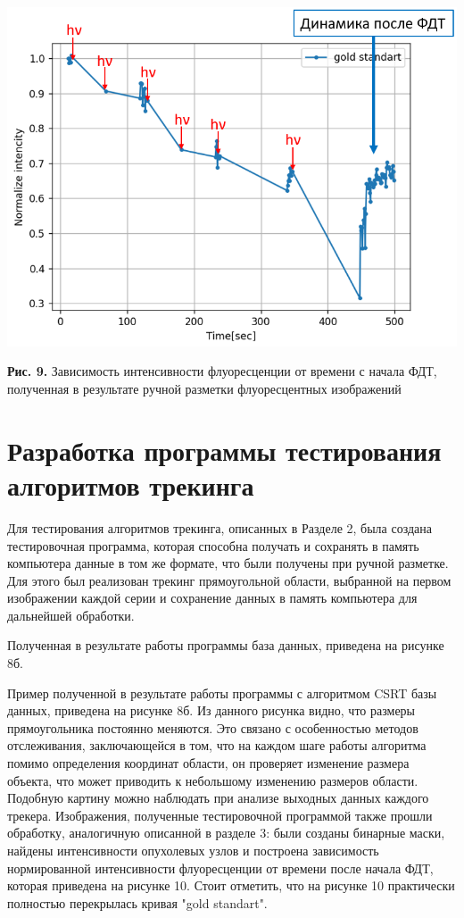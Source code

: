 \documentclass[a4paper,14pt]{extarticle}
\begin{document}
\begin{center}
    \includegraphics[scale = 0.9]{It.PNG}
    
    \textbf{Рис. 9.} Зависимость интенсивности флуоресценции от времени с начала ФДТ, полученная в результате ручной разметки флуоресцентных изображений  
\end{center}



\newpage 
\section{Разработка программы тестирования алгоритмов трекинга}
Для тестирования алгоритмов трекинга, описанных в Разделе 2, была создана тестировочная программа, которая способна получать и сохранять в память компьютера данные в том же формате, что были получены при ручной разметке. Для этого был реализован трекинг прямоугольной области, выбранной на первом изображении каждой серии и сохранение данных в память компьютера для дальнейшей обработки.


Полученная в результате работы программы база данных, приведена на рисунке 8б. 

Пример полученной в результате работы программы с алгоритмом CSRT базы данных, приведена на рисунке 8б.
Из данного рисунка видно, что размеры прямоугольника постоянно меняются. Это связано с особенностью методов отслеживания, заключающейся в том, что на каждом шаге работы алгоритма помимо определения координат области, он проверяет изменение размера объекта, что может приводить к небольшому изменению размеров области. Подобную картину можно наблюдать при анализе выходных данных каждого трекера.
Изображения, полученные тестировочной программой также прошли обработку, аналогичную описанной в разделе 3: были созданы бинарные маски, найдены интенсивности опухолевых узлов и построена зависимость нормированной интенсивности флуоресценции от времени после начала ФДТ, которая приведена на рисунке 10. Стоит отметить, что на рисунке 10 практически полностью перекрылась кривая "gold standart". 
\end{document}
